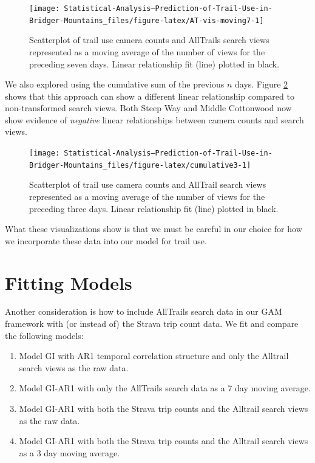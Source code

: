 \documentclass[
]{book}
\providecommand{\tightlist}{%
  \setlength{\itemsep}{0pt}\setlength{\parskip}{0pt}}
\begin{document}
\begin{figure}

{\centering \texttt{[image: Statistical-Analysis--Prediction-of-Trail-Use-in-Bridger-Mountains\_files/figure-latex/AT-vis-moving7-1]} 

}

\caption{Scatterplot of trail use camera counts and AllTrails search views represented as a moving average of the number of views for the preceding seven days. Linear relationship fit (line) plotted in black.}\label{fig:AT-vis-moving7}
\end{figure}

We also explored using the cumulative sum of the previous \(n\) days. Figure \ref{fig:cumulative3} shows that this approach can show a different linear relationship compared to non-transformed search views. Both Steep Way and Middle Cottonwood now show evidence of \emph{negative} linear relationships between camera counts and search views.

\begin{figure}

{\centering \texttt{[image: Statistical-Analysis--Prediction-of-Trail-Use-in-Bridger-Mountains\_files/figure-latex/cumulative3-1]} 

}

\caption{Scatterplot of trail use camera counts and AllTrail search views represented as a moving average of the number of views for the preceding three days. Linear relationship fit (line) plotted in black. }\label{fig:cumulative3}
\end{figure}

What these visualizations show is that we must be careful in our choice for how we incorporate these data into our model for trail use.

\hypertarget{fitting-models}{%
\section{Fitting Models}\label{fitting-models}}

Another consideration is how to include AllTrails search data in our GAM framework with (or instead of) the Strava trip count data. We fit and compare the following models:

\begin{enumerate}
\def\labelenumi{\arabic{enumi}.}
\tightlist
\item
  Model GI with AR1 temporal correlation structure and only the Alltrail search views as the raw data.
\item
  Model GI-AR1 with only the AllTrails search data as a 7 day moving average.
\item
  Model GI-AR1 with both the Strava trip counts and the Alltrail search views as the raw data.
\item
  Model GI-AR1 with both the Strava trip counts and the Alltrail search views as a 3 day moving average.
\end{enumerate}
\end{document}
